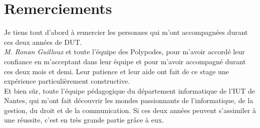 \section*{Remerciements}

Je tiens tout d'abord à remercier les personnes qui m'ont accompagnées durant ces deux années de DUT.\\

\textit{M. Ronan Guilloux} et toute l'équipe des Polypodes, pour m'avoir accordé leur confiance en m'acceptant dans leur équipe et pour m'avoir accompagné durant ces deux mois et demi. Leur patience et leur aide ont fait de ce stage une expérience particulièrement constructive.\\

Et bien sûr, toute l'équipe pédagogique du département informatique de l'IUT de Nantes, qui m'ont fait découvrir les mondes passionnants de l'informatique, de la gestion, du droit et de la communication. Si ces deux années peuvent s'assimiler à une réussite, c'est en très grande partie grâce à eux.\\
